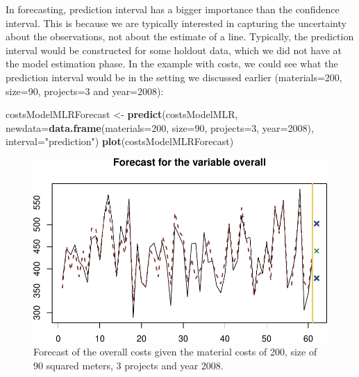 \documentclass[
]{book}
\newenvironment{Shaded}{\begin{snugshade}}{\end{snugshade}}
\newcommand{\AttributeTok}[1]{\textcolor[rgb]{0.13,0.29,0.53}{#1}}
\newcommand{\DecValTok}[1]{\textcolor[rgb]{0.00,0.00,0.81}{#1}}
\newcommand{\FunctionTok}[1]{\textcolor[rgb]{0.13,0.29,0.53}{\textbf{#1}}}
\newcommand{\NormalTok}[1]{#1}
\newcommand{\OtherTok}[1]{\textcolor[rgb]{0.56,0.35,0.01}{#1}}
\newcommand{\StringTok}[1]{\textcolor[rgb]{0.31,0.60,0.02}{#1}}
\theoremstyle{definition}
\theoremstyle{definition}
\theoremstyle{definition}
\theoremstyle{definition}
\theoremstyle{remark}
\begin{document}
In forecasting, prediction interval has a bigger importance than the confidence interval. This is because we are typically interested in capturing the uncertainty about the observations, not about the estimate of a line. Typically, the prediction interval would be constructed for some holdout data, which we did not have at the model estimation phase. In the example with costs, we could see what the prediction interval would be in the setting we discussed earlier (materials=200, size=90, projects=3 and year=2008):

\begin{Shaded}
\begin{Highlighting}[]
\NormalTok{costsModelMLRForecast }\OtherTok{\textless{}{-}} \FunctionTok{predict}\NormalTok{(costsModelMLR,}
                                 \AttributeTok{newdata=}\FunctionTok{data.frame}\NormalTok{(}\AttributeTok{materials=}\DecValTok{200}\NormalTok{, }\AttributeTok{size=}\DecValTok{90}\NormalTok{,}
                                                    \AttributeTok{projects=}\DecValTok{3}\NormalTok{, }\AttributeTok{year=}\DecValTok{2008}\NormalTok{),}
                                 \AttributeTok{interval=}\StringTok{"prediction"}\NormalTok{)}
\FunctionTok{plot}\NormalTok{(costsModelMLRForecast)}
\end{Highlighting}
\end{Shaded}

\begin{figure}
\centering
\includegraphics{Svetunkov---Statistics-for-Business-Analytics_files/figure-latex/costModelForecast-1.pdf}
\caption{\label{fig:costModelForecast}Forecast of the overall costs given the material costs of 200, size of 90 squared meters, 3 projects and year 2008.}
\end{figure}
\end{document}
